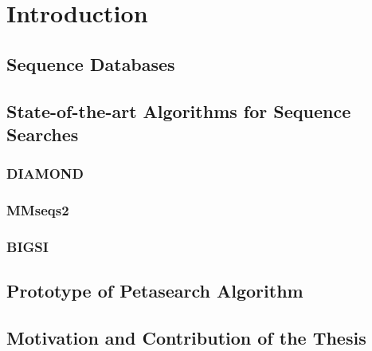 
\chapter{Introduction}


\section{Sequence Databases}

\section{State-of-the-art Algorithms for Sequence Searches}

\subsection{DIAMOND}

\subsection{MMseqs2}

\subsection{BIGSI}

\section{Prototype of Petasearch Algorithm}

\section{Motivation and Contribution of the Thesis}
